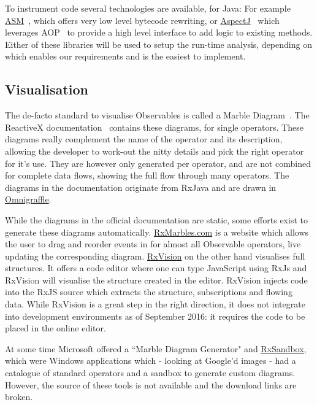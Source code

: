 To instrument code several technologies are available, for Java:  For
example \href{http://asm.ow2.org}{ASM}~\cite{bruneton2002asm,
kuleshov2007using}, which offers very low level bytecode rewriting, or
\href{http://www.eclipse.org/aspectj/}{AspectJ}~\cite{kiczales2001overview}
which leverages AOP~\cite{kiczales1997aspect} to provide a high level
interface to add logic to existing methods.  Either of these libraries
will be used to setup the run-time analysis, depending on which enables
our requirements and is the easiest to implement.

\subsection{Visualisation} The de-facto standard to visualise
Observables is called a Marble Diagram~\cite{c9_marblediagrams}.  The
ReactiveX documentation~\cite{reactivex} contains these diagrams, for
single operators.  These diagrams really complement the name of the
operator and its description, allowing the developer to work-out the
nitty details and pick the right operator for it's use.  They are
however only generated per operator, and are not combined for complete
data flows, showing the full flow through many operators.  The diagrams
in the documentation originate from RxJava and are drawn in \href{https://www.omnigroup.com/omnigraffle}
{Omnigraffle}.

While the diagrams in the official documentation are static, some
efforts exist to generate these diagrams automatically.  \href{http://RxMarbles.com}
{RxMarbles.com} is a website which allows the user to drag and reorder
events in for almost all Observable operators, live updating the
corresponding diagram.  \href{https://github.com/jaredly/rxvision}{RxVision}
on the other hand visualises full structures.  It offers a code editor
where one can type JavaScript using RxJs and RxVision will visualise the
structure created in the editor.  RxVision injects code into the RxJS
source which extracts the structure, subscriptions and flowing data.
While RxVision is a great step in the right direction, it does not
integrate into development environments as of September 2016:  it
requires the code to be placed in the online editor.

At some time Microsoft offered a ``Marble Diagram Generator" and \href{http://mnajder.blogspot.nl/2010/03/rxsandbox-v1.html}
{RxSandbox}, which were Windows applications which - looking at Google'd
images - had a catalogue of standard operators and a sandbox to generate
custom diagrams.  However, the source of these tools is not available
and the download links are broken.

